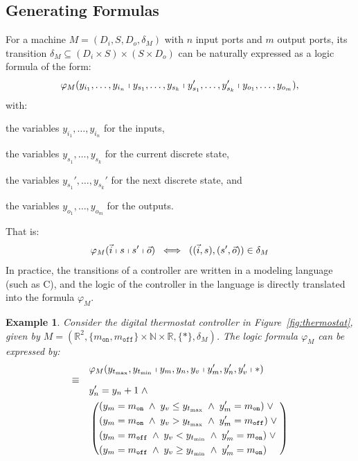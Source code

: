 \documentclass{sig-alternate}
\newtheorem{example}{Example}
\begin{document}
 


\subsection{Generating Formulas}

For a machine  $M = (D_i,S,D_o,\delta_M)$
with $n$ input ports and $m$ output ports,
its transition $\delta_M \subseteq (D_i \times S) \times (S \times D_o)$
can be naturally expressed as a %
logic formula of the form:
\[
\varphi_{M}(y_{i_1},\ldots,y_{i_n}\shortmid
y_{s_1},\ldots,y_{s_k}\shortmid
y_{s_1}',\ldots,y_{s_k}'\shortmid
y_{o_1},\ldots,y_{o_m}),
\]
with:
\begin{inparaenum}[(i)]
	\item the variables $y_{i_1},\ldots,y_{i_n}$ for the inputs,
	\item the variables $y_{s_1},\ldots,y_{s_k}$  for the current discrete state, 
	\item the variables $y_{s_1}',\ldots,y_{s_k}'$  for the next discrete state, and 
	\item the variables $y_{o_1},\ldots,y_{o_m}$  for the outputs.
\end{inparaenum}
That is:
\begin{equation}
\varphi_{M}(\vec{i}\shortmid s\shortmid s'\shortmid  \vec{o})
\;\iff\;
( (\vec{i}, s), (s', \vec{o}) ) \in \delta_{M}
\label{eq:formula-rel-machine}
\end{equation}
In practice, the transitions of a controller are written 
in a modeling language (such as C),
and the logic of the controller in the language
is directly translated into the formula $\varphi_{M}$.


\begin{example}
\label{ex:thermo-formula}
Consider the digital thermostat controller in Figure~\ref{fig:thermostat},
given by
$M = (\mathbb{R}^2, \{m_\texttt{on},m_\texttt{off}\} \times \mathbb{N} \times \mathbb{R}, \{\ast\}, \delta_M)$.
The logic formula $\varphi_{M}$ can be expressed by:
\begin{alignat*}{2}
&
\varphi_{M}(
y_{t_{\max}}, y_{t_{\min}}\shortmid
y_m, y_n, y_v\shortmid
y_m', y_n', y_v'\shortmid
\ast)
\\
\ArrowBetweenLines[\equiv]
%
& y_n' = y_n + 1 \;\wedge\; 
\\
& 
\left(
\begin{aligned}
&(y_m = m_\texttt{on} \;\wedge\; y_v \leq y_{t_{\max}} \;\wedge\; y_m' = m_\texttt{on}) \;\vee\;
\\
& (y_m = m_\texttt{on} \;\wedge\; y_v > y_{t_{\max}} \;\wedge\; y_m' = m_\texttt{off}) \;\vee\;
\\
& (y_m = m_\texttt{off} \;\wedge\; y_v < y_{t_{\min}} \;\wedge\; y_m' = m_\texttt{on}) \;\vee\;
\\
& (y_m = m_\texttt{off} \;\wedge\; y_v \geq y_{t_{\min}} \;\wedge\; y_m' = m_\texttt{on})
\end{aligned}
\right)
\end{alignat*}
\end{example}
\end{document}
